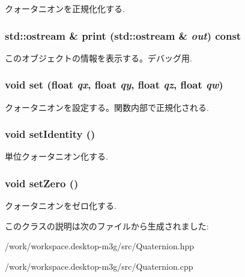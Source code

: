 クォータニオンを正規化化する. \hypertarget{classm3g_1_1Quaternion_6fea17fa1532df3794f8cb39cb4f911f}{
\subsubsection[{print}]{\setlength{\rightskip}{0pt plus 5cm}std::ostream \& print (std::ostream \& {\em out}) const}}
\label{classm3g_1_1Quaternion_6fea17fa1532df3794f8cb39cb4f911f}


このオブジェクトの情報を表示する。デバッグ用. \hypertarget{classm3g_1_1Quaternion_0712dc357557a30ac0da0a9d4cdd278c}{
\subsubsection[{set}]{\setlength{\rightskip}{0pt plus 5cm}void set (float {\em qx}, \/  float {\em qy}, \/  float {\em qz}, \/  float {\em qw})}}
\label{classm3g_1_1Quaternion_0712dc357557a30ac0da0a9d4cdd278c}


クォータニオンを設定する。関数内部で正規化される. \hypertarget{classm3g_1_1Quaternion_382e6ad7e6721b121e510959e1011be3}{
\subsubsection[{setIdentity}]{\setlength{\rightskip}{0pt plus 5cm}void setIdentity ()}}
\label{classm3g_1_1Quaternion_382e6ad7e6721b121e510959e1011be3}


単位クォータニオン化する. \hypertarget{classm3g_1_1Quaternion_47affd1a10b589811fc4828c1a2e0c6d}{
\subsubsection[{setZero}]{\setlength{\rightskip}{0pt plus 5cm}void setZero ()}}
\label{classm3g_1_1Quaternion_47affd1a10b589811fc4828c1a2e0c6d}


クォータニオンをゼロ化する. 

このクラスの説明は次のファイルから生成されました:\begin{CompactItemize}
\item 
/work/workspace.desktop-m3g/src/Quaternion.hpp\item 
/work/workspace.desktop-m3g/src/Quaternion.cpp\end{CompactItemize}

